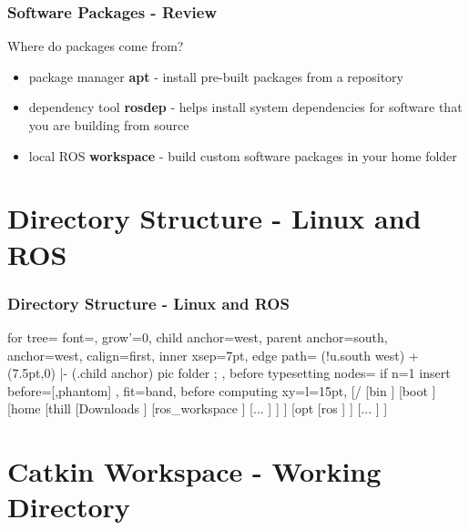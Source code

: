 \documentclass[fleqn]{beamer} %
\newcommand{\sectiontitleI}{Software Packages - Review} %
\newcommand{\sectiontitleII}{Directory Structure - Linux and ROS}
\newcommand{\sectiontitleIII}{Catkin Workspace - Working Directory}
\begin{document}
	\begin{frame}[containsverbatim] \small
		\frametitle{\sectiontitleI}

	Where do packages come from?		
	
	\begin{itemize}
	\item package manager {\bf apt} - install pre-built packages from a repository \vspace{3mm}
	
	\item dependency tool {\bf rosdep} - helps install system dependencies for software that you are building from source \vspace{3mm}
	
	\item local ROS {\bf workspace} - build custom software packages in your home folder \vspace{3mm}				
	\end{itemize}


	\end{frame}

\section{\sectiontitleII}

	\begin{frame}[label=sectionII,containsverbatim] \small
		\frametitle{\sectiontitleII}
		
		\begin{forest}
  	for tree={
    font=\ttfamily,
    grow'=0,
    child anchor=west,
    parent anchor=south,
    anchor=west,
    calign=first,
    inner xsep=7pt,
    edge path={
      \noexpand{}
      (!u.south west) +(7.5pt,0) |- (.child anchor) pic {folder} ;
    },
    before typesetting nodes={
      if n=1
        {insert before={[,phantom]}}
        {}
    },
    fit=band,
    before computing xy={l=15pt},
  	}  
[/
  [bin
  ]
  [boot
  ]
  [home
    [thill
    	[Downloads
    	]
    	[ros\_workspace
    	]
    	[...
    	]
    ]
  ]
  [opt
    [ros
    ]
  ]
  [...
  ]
]
\end{forest}
 

\end{frame}

\section{\sectiontitleIII}
\end{document}
